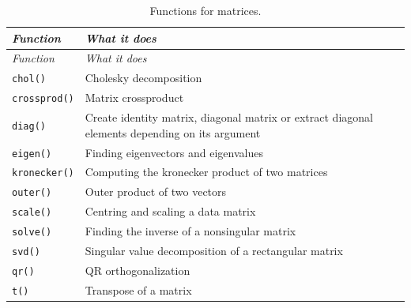 \documentclass[
]{book}
\begin{document}
\begin{longtable}[]{@{}
  >{\raggedright\arraybackslash}p{}
  >{\raggedright\arraybackslash}p{}@{}}
\caption{\label{tab:MatrixFunc} Functions for matrices.}\tabularnewline
\toprule\noalign{}
\begin{minipage}[b]{\linewidth}\raggedright
\emph{{Function}}
\end{minipage} & \begin{minipage}[b]{\linewidth}\raggedright
\emph{{What it does}}
\end{minipage} \\
\midrule\noalign{}
\endfirsthead
\toprule\noalign{}
\begin{minipage}[b]{\linewidth}\raggedright
\emph{{Function}}
\end{minipage} & \begin{minipage}[b]{\linewidth}\raggedright
\emph{{What it does}}
\end{minipage} \\
\midrule\noalign{}
\endhead
\bottomrule\noalign{}
\endlastfoot
\texttt{chol()} & Cholesky decomposition \\
\texttt{crossprod()} & Matrix crossproduct \\
\texttt{diag()} & Create identity matrix, diagonal matrix or extract diagonal elements depending on its argument \\
\texttt{eigen()} & Finding eigenvectors and eigenvalues \\
\texttt{kronecker()} & Computing the kronecker product of two matrices \\
\texttt{outer()} & Outer product of two vectors \\
\texttt{scale()} & Centring and scaling a data matrix \\
\texttt{solve()} & Finding the inverse of a nonsingular matrix \\
\texttt{svd()} & Singular value decomposition of a rectangular matrix \\
\texttt{qr()} & QR orthogonalization \\
\texttt{t()} & Transpose of a matrix \\
\end{longtable}
\end{document}
